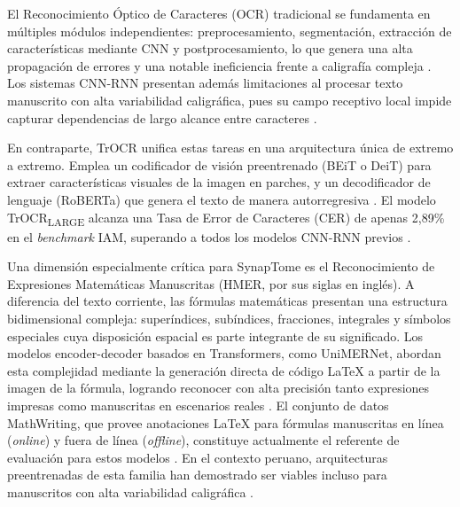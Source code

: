 El Reconocimiento Óptico de Caracteres (OCR) tradicional se fundamenta en múltiples 
módulos independientes: preprocesamiento, segmentación, extracción de características 
mediante CNN y postprocesamiento, lo que genera una alta propagación de errores y una 
notable ineficiencia frente a caligrafía compleja \parencite{Zhang2026}. Los sistemas 
CNN-RNN presentan además limitaciones al procesar texto manuscrito con alta variabilidad 
caligráfica, pues su campo receptivo local impide capturar dependencias de largo alcance 
entre caracteres \parencite{LiTrOCR2023}.

En contraparte, TrOCR unifica estas tareas en una arquitectura única de extremo a extremo. 
Emplea un codificador de visión preentrenado (BEiT o DeiT) para extraer características 
visuales de la imagen en parches, y un decodificador de lenguaje (RoBERTa) que genera 
el texto de manera autorregresiva \textcite{LiTrOCR2023}. El modelo 
TrOCR\textsubscript{LARGE} alcanza una Tasa de Error de Caracteres (CER) de apenas 
2,89\% en el \textit{benchmark} IAM, superando a todos los modelos CNN-RNN previos 
\parencite{SharmaTrOCR2025}.

Una dimensión especialmente crítica para SynapTome es el Reconocimiento de Expresiones 
Matemáticas Manuscritas (HMER, por sus siglas en inglés). A diferencia del texto corriente, 
las fórmulas matemáticas presentan una estructura bidimensional compleja: superíndices, 
subíndices, fracciones, integrales y símbolos especiales cuya disposición espacial es 
parte integrante de su significado. Los modelos encoder-decoder basados en Transformers, 
como UniMERNet, abordan esta complejidad mediante la generación directa de código \LaTeX{} 
a partir de la imagen de la fórmula, logrando reconocer con alta precisión tanto 
expresiones impresas como manuscritas en escenarios reales \parencite{AlvarezPerez2026}. 
El conjunto de datos MathWriting, que provee anotaciones \LaTeX{} para fórmulas 
manuscritas en línea (\textit{online}) y fuera de línea (\textit{offline}), constituye 
actualmente el referente de evaluación para estos modelos \parencite{AlvarezPerez2026}. 
En el contexto peruano, arquitecturas preentrenadas de esta familia han demostrado ser 
viables incluso para manuscritos con alta variabilidad caligráfica \parencite{TarazonaCruz2024}.

